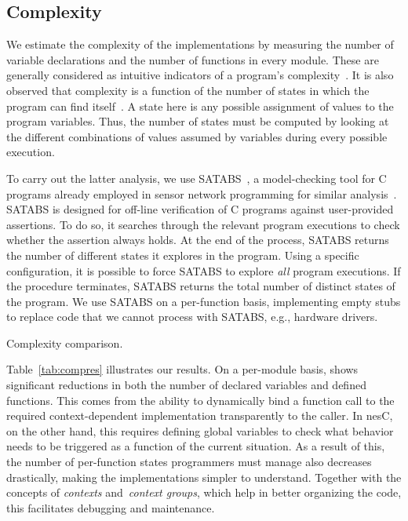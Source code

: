 \subsection{Complexity}\label{sec:complexity}

We estimate the complexity of the implementations by measuring the
number of variable declarations and the number of functions in every
module. These are generally considered as intuitive indicators of a
program's complexity~\cite{pressman01}. It is also observed that
complexity is a function of the number of states in which the program
can find itself~\cite{35}. A state here is any possible assignment of
values to the program variables. Thus, the number of states must be
computed by looking at the different combinations of values assumed by
variables during every possible execution.

To carry out the latter analysis, we use SATABS~\cite{satabs}, a
model-checking tool for C programs already employed in sensor network
programming for similar analysis~\cite{mottola11survey}. SATABS is
designed for off-line verification of C programs against user-provided
assertions. To do so, it searches through the relevant program
executions to check whether the assertion always holds. At the end of
the process, SATABS returns the number of different states it explores
in the program.  Using a specific configuration, it is possible to
force SATABS to explore \emph{all} program executions. If the
procedure terminates, SATABS returns the total number of distinct
states of the program. We use SATABS on a per-function basis,
implementing empty stubs to replace code that we cannot process with
SATABS, e.g., hardware drivers.

\begin{table}[!tb]
\renewcommand{\arraystretch}{1.3}
\caption{Complexity comparison.}
\label{tab:compres}

\end{table}

 Table~\ref{tab:compres} illustrates our
results. On a per-module basis, \conesc shows significant reductions
in both the number of declared variables and defined functions. This
comes from the ability to dynamically bind a function call to the
required context-dependent implementation transparently to the
caller. In nesC, on the other hand, this requires defining global
variables to check what behavior needs to be triggered as a function
of the current situation. As a result of this, the number of
per-function states programmers must manage also decreases
drastically, making the implementations simpler to
understand. Together with the concepts of \emph{contexts}
and~\emph{context groups}, which help in better organizing the code,
this facilitates debugging and maintenance.

